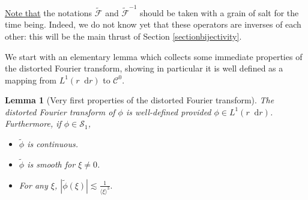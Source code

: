 \documentclass[11 pt]{amsart}
\newtheorem{lem}{Lemma}[section]
\theoremstyle{definition}
\theoremstyle{remark}
\numberwithin{equation}{section}
\newcommand{\dd}{\mathop{}\!\mathrm{d}}
\begin{document}
\underline{Note that} the notations $\widetilde{\mathcal{F}}$ and $\widetilde{\mathcal{F}}^{-1}$ should be taken with a grain of salt for the time being. Indeed, we do not know yet that these operators are inverses of each other: this will be the main thrust of Section \ref{sectionbijectivity}.

We start with an elementary lemma which collects some immediate properties of the distorted Fourier transform, showing in particular it is well defined as a mapping from $L^1(r \dd r)$ to $\mathcal{C}^0$. 


\begin{lem}[Very first properties of the distorted Fourier transform] 
\label{lemmaveryfirst} The distorted Fourier transform of $\phi$ is well-defined provided $\phi \in L^1(r \dd r)$. Furthermore, if $\phi \in \mathcal{S}_1$,
\begin{itemize}
\item[(i)] $\widetilde{\phi}$ is continuous.
\item[(ii)] $\widetilde{\phi}$ is smooth for $\xi \neq 0$.
\item[(iii)] For any $\xi$, $\displaystyle |\widetilde{\phi}(\xi)| \lesssim \frac{1}{\langle \xi \rangle^3}.$
\end{itemize}
\end{lem}
\end{document}
